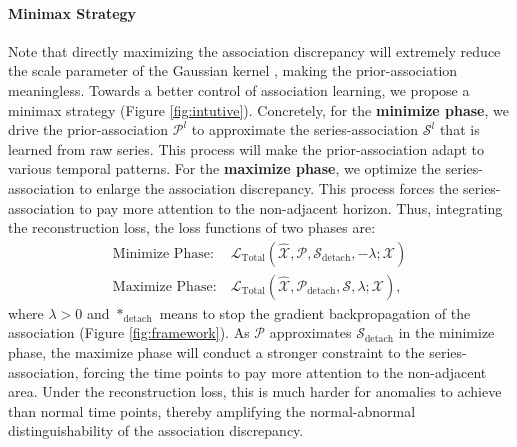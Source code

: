 \documentclass{article} %
\begin{document}
\paragraph{Minimax Strategy} Note that directly maximizing the association discrepancy will extremely reduce the scale parameter of the Gaussian kernel \citep{Neal2007PatternRA}, making the prior-association meaningless. Towards a better control of association learning, we propose a minimax strategy (Figure \ref{fig:intutive}). Concretely, for the \textbf{minimize phase}, we drive the prior-association $\mathcal{P}^l$ to approximate the series-association $\mathcal{S}^l$ that is learned from raw series. This process will make the prior-association adapt to various temporal patterns. For the \textbf{maximize phase}, we optimize the series-association to enlarge the association discrepancy. This process forces the series-association to pay more attention to the non-adjacent horizon. Thus, integrating the reconstruction loss, the loss functions of two phases are:
\begin{equation}\label{equ:minmax}
  \begin{split}
 \text{Minimize\ Phase:}&\ \mathcal{L}_{\text{Total}}({\widehat{\mathcal{X}}},\mathcal{P},\mathcal{S}_{\text{detach}},-\lambda;\mathcal{X})\\ \text{Maximize\ Phase:}&\ \mathcal{L}_{\text{Total}}({\widehat{\mathcal{X}}},\mathcal{P}_{\text{detach}},\mathcal{S},\lambda;\mathcal{X}),
  \end{split}
\end{equation}
where $\lambda>0$ and $\ast_{\text{detach}}$ means to stop the gradient backpropagation of the association (Figure \ref{fig:framework}). 
As $\mathcal{P}$ approximates $\mathcal{S}_{\text{detach}}$ in the minimize phase, the maximize phase will conduct a stronger constraint to the series-association, forcing the time points to pay more attention to the non-adjacent area. Under the reconstruction loss, this is much harder for anomalies to achieve than normal time points, thereby amplifying the normal-abnormal distinguishability of the association discrepancy.

\vspace{-5pt}
\end{document}
